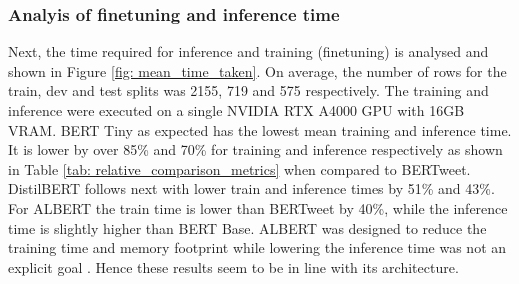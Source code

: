 \subsubsection{Analyis of finetuning and inference time}

Next, the time required for inference and training (finetuning) is analysed and shown in Figure \ref{fig: mean_time_taken}. On average, the number of rows for the train, dev and test splits was 2155, 719 and 575 respectively. The training and inference were executed on a single NVIDIA RTX A4000 GPU with 16GB VRAM. BERT Tiny as expected has the lowest mean training and inference time. It is lower by over 85\% and 70\% for training and inference respectively as shown in Table \ref{tab: relative_comparison_metrics} when compared to BERTweet. DistilBERT follows next with lower train and inference times by 51\% and 43\%. For ALBERT the train time is lower than BERTweet by 40\%, while the inference time is slightly higher than BERT Base. ALBERT was designed to reduce the training time and memory footprint while lowering the inference time was not an explicit goal \cite{lanALBERTLiteBERT2020}. Hence these results seem to be in line with its architecture. 
